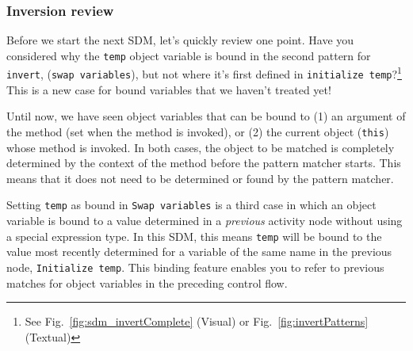 \newpage
\subsubsection{Inversion review}
\genHeader
\hypertarget{invert close}{}

Before we start the next SDM, let's quickly review one point. Have you considered why the \texttt{temp} object variable is bound in the second pattern for
\texttt{invert}, (\texttt{swap variables}), but not where it's first defined in \texttt{initialize temp}?\footnote{See Fig.~\ref{fig:sdm_invertComplete}
(Visual) or Fig.~\ref{fig:invertPatterns} (Textual)} This is a new case for bound variables that we haven't treated yet!

Until now, we have seen object variables that can be bound to (1) an argument of the method (set when the method is invoked), or (2) the
current object (\texttt{this}) whose method is invoked. In both cases, the object to be matched is completely determined by the context of the method before
the pattern matcher starts. This means that it does not need to be determined or found by the pattern matcher.

Setting \texttt{temp} as bound in \texttt{Swap variables} is a third case in which an object variable is bound to a value determined in a \emph{previous}
activity node without using a special expression type. In this SDM, this means \texttt{temp} will be bound to the value most recently determined for a variable
of the same name in the previous node, \texttt{Initialize temp}. This binding feature enables you to refer to previous matches for object variables in the
preceding control flow.
